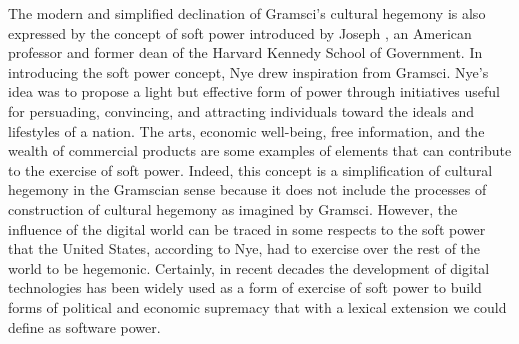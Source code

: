 The modern and simplified declination of Gramsci's cultural hegemony is also expressed by the concept of soft power introduced by Joseph \citet{chap:8:Nye:2009}, an American professor and former dean of the Harvard Kennedy School of Government. In introducing the soft power concept, Nye drew inspiration from Gramsci. Nye's idea was to propose a light but effective form of power through initiatives useful for persuading, convincing, and attracting individuals toward the ideals and lifestyles of a nation. The arts, economic well-being, free information, and the wealth of commercial products are some examples of elements that can contribute to the exercise of soft power. Indeed, this concept is a simplification of cultural hegemony in the Gramscian sense because it does not include the processes of construction of cultural hegemony as imagined by Gramsci. However, the influence of the digital world can be traced in some respects to the soft power that the United States, according to Nye, had to exercise over the rest of the world to be hegemonic. \hbox{Certainly,} in recent decades the development of digital technologies has been widely used as a form of exercise of soft power to build forms of political and economic supremacy that with a lexical extension we could define as software power\vadjust{\vspace*{-18pt}\pagebreak}.

